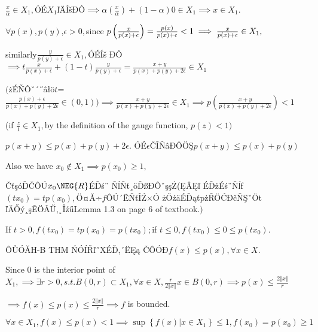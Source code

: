 \documentclass{article}
\begin{document}
\begin{CJK}{GBK}{song}
$\frac{x}{\alpha }\in X_{1},$ÓÉ$X_{1}$ľÄÍšĐÔ$%
\implies \alpha \left( \frac{x}{\alpha }\right) +\left( 1-\alpha \right)
0\in X_{1}\implies x\in X_{1}.$

$\forall p\left( x\right) ,p\left( y\right) $,$\epsilon >0,$since $p\left( 
\frac{x}{p\left( x\right) +\epsilon }\right) =\frac{p\left( x\right) }{%
p\left( x\right) +\epsilon }<1\implies \frac{x}{p\left( x\right) +\epsilon }%
\in X_{1},$

similarly$\frac{y}{p\left( y\right) +\epsilon }\in X_{1},$ÓÉÍš%
ĐÔ$\implies t\frac{x}{p\left( x\right) +\epsilon }+\left( 1-t\right) 
\frac{y}{p\left( y\right) +\epsilon }=\frac{x+y}{p\left( x\right) +p\left(
y\right) +2\epsilon }\in X_{1}$

$($żÉŇÔˇ´˝âłö$t$=$\frac{p\left( x\right)
+\epsilon }{p\left( x\right) +p\left( y\right) +2\epsilon }\in \left(
0,1\right) )\implies \frac{x+y}{p\left( x\right) +p\left( y\right)
+2\epsilon }\in X_{1}\implies p\left( \frac{x+y}{p\left( x\right) +p\left(
y\right) +2\epsilon }\right) <1$

(if $\frac{z}{1}\in X_{1},$by the definition of the gauge function, $p\left(
z\right) <1)$

$p\left( x+y\right) \leq p\left( x\right) +p\left( y\right) +2\epsilon .$%
ÓÉ$\epsilon $ČÎŇâĐÔÖŞ$p\left( x+y\right) \leq
p\left( x\right) +p\left( y\right) $

Also we have $x_{0}\notin X_{1}\implies p\left( x_{0}\right) \geq 1,$

\bigskip ČťşóĎČÔÚ$x_{0}\NEG{R}$ÉĎś¨%
ŇĺŇť¸öĎßĐÔˇşşŻ(ĘÂĘľ%
ÉĎżÉś¨Ňĺf$\left( tx_{0}\right) =tp\left(
x_{0}\right) ,$Ö¤Ă÷$f$ÔÚ´ËŇťÎŹ×Ó%
żŐźäÉĎąťpżŘÖĆĐčŇŞˇÖt%
ľÄŐý¸şĚÖÂŰ,˛ÎźűLemma 1.3 on page 6
of textbook.$)$

If $t>0,f\left( tx_{0}\right) =tp\left( x_{0}\right) =p\left( tx_{0}\right)
; $if $t\leq 0,f\left( tx_{0}\right) \leq 0\leq p\left( tx_{0}\right) .$

ÔŮÓĂH-B THM ŃÓÍŘľ˝XÉĎ,´ËĘą%
ČÔÓĐ$f(x)\leq p\left( x\right) ,\forall x\in X$.

Since $0$ is the interior point of $X_{1},\implies \exists r>0,s.t.B\left(
0,r\right) \subset X_{1},\forall x\in X,\frac{r}{2\left\Vert x\right\Vert }%
x\in B\left( 0,r\right) \implies p\left( x\right) \leq \frac{2\left\Vert
x\right\Vert }{r}$

$\implies f\left( x\right) \leq p\left( x\right) \leq \frac{2\left\Vert
x\right\Vert }{r}\implies f$ is bounded.

\bigskip $\forall x\in X_{1},f\left( x\right) \leq p\left( x\right)
<1\implies \sup \left\{ f\left( x\right) |x\in X_{1}\right\} \leq 1,f\left(
x_{0}\right) =p\left( x_{0}\right) \geq 1$


\end{CJK}
\end{document}
